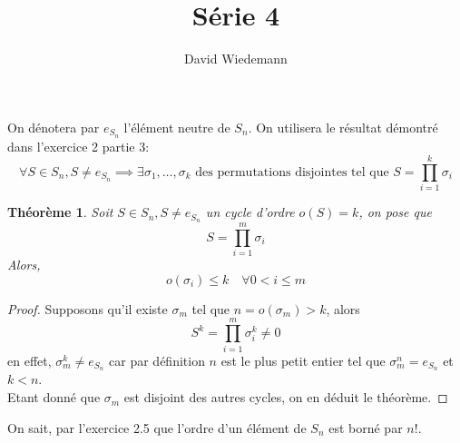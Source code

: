 \documentclass[11pt, a4paper, twoside]{article}
\newtheorem{theorem}{Théorème}
\begin{document}
\title{Série 4}
\author{David Wiedemann}
\maketitle
On dénotera par $e_{S_n} $ l'élément neutre de $S_n$.
On utilisera le résultat démontré dans l'exercice 2 partie 3:
\[ 
	\forall S \in S_n, S \neq e_{S_n}  \implies \exists \sigma_1,\ldots,\sigma_k \text{ des permutations disjointes tel que } S = \prod_{i=1} ^{k} \sigma_i
\]

\begin{theorem}
	Soit $S \in S_n, S \neq e_{S_n} $ un cycle d'ordre $o(S)=k$, on pose que
	\[
		S = \prod_{i=1} ^{m} \sigma_i
	\]
	Alors,
	\[ 
		o(\sigma_i) \leq k \quad \forall 0< i \leq m
	\]
\end{theorem}
\begin{proof}
	Supposons qu'il existe $\sigma_m$ tel que $n=o(\sigma_m) > k$, alors
	 \[ 
	S^{k}= \prod_{i=1} ^{m} \sigma_i^{k} \neq 0
	\]
	en effet, $\sigma_m^{k} \neq e_{S_n}$ car par définition $n$ est le plus petit entier tel que $\sigma_m^{n}=e_{S_n}$ et $k<n$.\\
	Etant donné que $\sigma_m$ est disjoint des autres cycles, on en déduit le théorème.
\end{proof}
On sait, par l'exercice 2.5 que l'ordre d'un élément de $S_n$ est borné par $n!$.\\
\end{document}
